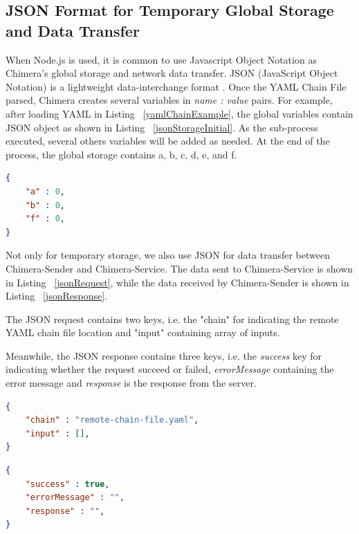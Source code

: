 \documentclass[conference]{IEEEtran}
\begin{document}
\subsection{JSON Format for Temporary Global Storage and Data Transfer}

When Node.js is used, it is common to use Javascript Object Notation as Chimera's
global storage and network data transfer. JSON (JavaScript Object Notation) is a 
lightweight data-interchange format \cite{json}. Once the YAML Chain File parsed, Chimera creates several variables in {\it name : 
value} pairs. For example, after loading YAML in Listing ~\ref{yamlChainExample}, the
global variables contain JSON object as shown in Listing ~\ref{jsonStorageInitial}. As the sub-process executed, several others variables will be added as needed. At the
end of the process, the global storage contains a, b, c, d, e, and f.

\begin{lstlisting}[caption=Initial content of JSON Storage, label=jsonStorageInitial, language=json, basicstyle=\small, breaklines=true]
{
    "a" : 0,
    "b" : 0,
    "f" : 0,
}
\end{lstlisting}

Not only for temporary storage, we also use JSON for data transfer between 
Chimera-Sender and Chimera-Service. The data sent to Chimera-Service is shown in Listing
~\ref{jsonRequest}, while the data received by Chimera-Sender is shown in Listing
~\ref{jsonResponse}.

The JSON request contains two keys, i.e. the "chain" for 
indicating the remote YAML chain file location and "input" containing array of inputs.

Meanwhile, the JSON response contains three keys, i.e. the {\it success} key for indicating
whether the request succeed or failed, {\it errorMessage} containing the error message and
{\it response} is the response from the server.

\begin{lstlisting}[caption=JSON Request, label=jsonRequest, language=json, basicstyle=\small, breaklines=true] 
{
    "chain" : "remote-chain-file.yaml",
    "input" : [],
}
\end{lstlisting}

\begin{lstlisting}[caption=JSON Response, label=jsonResponse, language=json, basicstyle=\small, breaklines=true]
{
    "success" : true,
    "errorMessage" : "",
    "response" : "",
}
\end{lstlisting}
\end{document}
